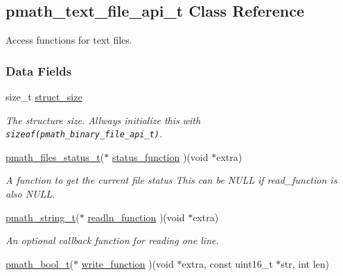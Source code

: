 \hypertarget{structpmath__text__file__api__t}{
\subsection{pmath\_\-text\_\-file\_\-api\_\-t Class Reference}
\label{structpmath__text__file__api__t}
}
Access functions for text files.  


\subsubsection*{Data Fields}
\begin{CompactItemize}
\item 
\hypertarget{structpmath__text__file__api__t_81f514ebd650b6f9fafa729b8f11f6c1}{
size\_\-t \hyperlink{structpmath__text__file__api__t_81f514ebd650b6f9fafa729b8f11f6c1}{struct\_\-size}}
\label{structpmath__text__file__api__t_81f514ebd650b6f9fafa729b8f11f6c1}

\begin{CompactList}\small\item\em The structure size. Allways initialize this with {\tt sizeof(pmath\_\-binary\_\-file\_\-api\_\-t)}. \item\end{CompactList}\item 
\hypertarget{structpmath__text__file__api__t_b653cb79f5d125547273d92c8732ae56}{
\hyperlink{group__file__api_g1fa07caf59a04495b7c74be6aff3a3d9}{pmath\_\-files\_\-status\_\-t}($\ast$ \hyperlink{structpmath__text__file__api__t_b653cb79f5d125547273d92c8732ae56}{status\_\-function} )(void $\ast$extra)}
\label{structpmath__text__file__api__t_b653cb79f5d125547273d92c8732ae56}

\begin{CompactList}\small\item\em A function to get the current file status This can be NULL if read\_\-function is also NULL. \item\end{CompactList}\item 
\hypertarget{structpmath__text__file__api__t_abe46e2df9d80cd8cbdea420ca5f4542}{
\hyperlink{classpmath__string__t}{pmath\_\-string\_\-t}($\ast$ \hyperlink{structpmath__text__file__api__t_abe46e2df9d80cd8cbdea420ca5f4542}{readln\_\-function} )(void $\ast$extra)}
\label{structpmath__text__file__api__t_abe46e2df9d80cd8cbdea420ca5f4542}

\begin{CompactList}\small\item\em An optional callback function for reading one line. \item\end{CompactList}\item 
\hypertarget{structpmath__text__file__api__t_ce3f46ffa4c01b12baf1d4f981c6bcb9}{
\hyperlink{group__general__types_gc92090cb0b56345d6c379ed2341d4ef4}{pmath\_\-bool\_\-t}($\ast$ \hyperlink{structpmath__text__file__api__t_ce3f46ffa4c01b12baf1d4f981c6bcb9}{write\_\-function} )(void $\ast$extra, const uint16\_\-t $\ast$str, int len)}
\label{structpmath__text__file__api__t_ce3f46ffa4c01b12baf1d4f981c6bcb9}


\end{CompactItemize}

